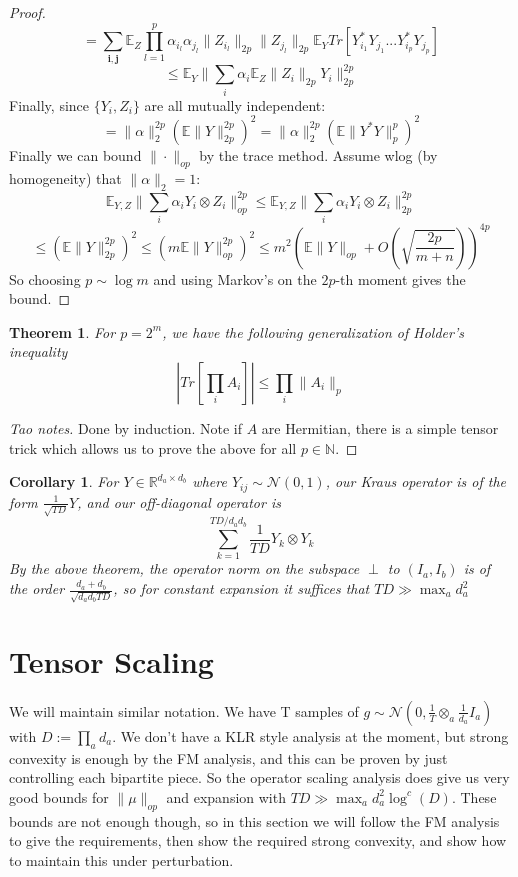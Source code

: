 \documentclass{article}
\newtheorem{theorem}{Theorem}
\newtheorem{corollary}{Corollary}
\newcommand{\R}{{\mathbb{R}}}
\renewcommand{\vec}{\bm}
\newcommand{\E}{\mathbb{E}}
\begin{document}
\begin{proof}
\[ = \sum_{\vec{i},\vec{j}} \E_{Z} \prod_{l=1}^{p} \alpha_{i_{l}} \alpha_{j_{l}} \|Z_{i_{l}}\|_{2p} \|Z_{j_{l}}\|_{2p} \E_{Y} Tr [ Y_{i_{1}}^{*} Y_{j_{1}} ... Y_{i_{p}}^{*} Y_{j_{p}} ]  \]
\[ \leq \E_{Y} \|\sum_{i} \alpha_{i} \E_{Z} \|Z_{i}\|_{2p} Y_{i} \|_{2p}^{2p}   \]
Finally, since $\{Y_{i},Z_{i}\}$ are all mutually independent:
\[ = \|\alpha\|_{2}^{2p} ( \E \|Y\|_{2p}^{2p} )^{2} = \|\alpha\|_{2}^{2p} ( \E \|Y^{*} Y\|_{p}^{p} )^{2}  \]
Finally we can bound $\|\cdot\|_{op}$ by the trace method. Assume wlog (by homogeneity) that $\|\alpha\|_{2} = 1$:
\[ \E_{Y,Z} \|\sum_{i} \alpha_{i} Y_{i} \otimes Z_{i} \|_{op}^{2p} \leq \E_{Y,Z} \|\sum_{i} \alpha_{i} Y_{i} \otimes Z_{i} \|_{2p}^{2p} \]
\[ \leq ( \E \|Y\|_{2p}^{2p} )^{2} \leq ( m \E \|Y\|_{op}^{2p} )^{2} \leq m^{2} (\E \|Y\|_{op} + O(\sqrt{\frac{2p}{m+n}}))^{4p} \]
So choosing $p \sim \log m$ and using Markov's on the $2p$-th moment gives the bound. 
\end{proof}

\begin{theorem}
For $p = 2^{m}$, we have the following generalization of Holder's inequality
\[ |Tr[\prod_{i} A_{i}]| \leq \prod_{i} \|A_{i}\|_{p}   \]
\end{theorem}
\begin{proof} [Tao notes]
Done by induction. Note if $A$ are Hermitian, there is a simple tensor trick which allows us to prove the above for all $p \in \mathbb{N}$. 
\end{proof}

\begin{corollary}
For $Y \in \R^{d_{a} \times d_{b}}$ where $Y_{ij} \sim \mathcal{N}(0,1)$, our Kraus operator is of the form $\frac{1}{\sqrt{TD}} Y$, and our off-diagonal operator is
\[ \sum_{k=1}^{TD/d_{a}d_{b}} \frac{1}{TD} Y_{k} \otimes Y_{k}   \]
By the above theorem, the operator norm on the subspace $\perp$ to $(I_{a},I_{b})$ is of the order $\frac{d_{a}+d_{b}}{\sqrt{d_{a} d_{b} TD}}$, so for constant expansion it suffices that $TD \gg \max_{a} d_{a}^{2}$
\end{corollary}


\section{Tensor Scaling}
We will maintain similar notation. We have T samples of $g \sim \mathcal{N}(0,\frac{1}{T} \otimes_{a} \frac{1}{d_{a}} I_{a})$ with $D := \prod_{a} d_{a}$. We don't have a KLR style analysis at the moment, but strong convexity is enough by the FM analysis, and this can be proven by just controlling each bipartite piece. So the operator scaling analysis does give us very good bounds for $\|\mu\|_{op}$ and expansion with $TD \gg \max_{a} d_{a}^{2} \log^{c}(D)$. These bounds are not enough though, so in this section we will follow the FM analysis to give the requirements, then show the required strong convexity, and show how to maintain this under perturbation. 
\end{document}
